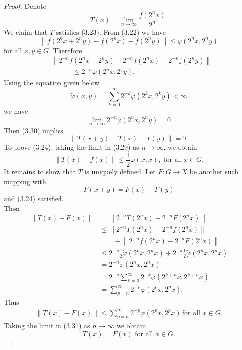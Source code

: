 \documentclass[a4paper,12pt]{report}
\begin{document}
\begin{thm}
\begin{proof}
Denote
$$
T(x)=\lim _{n \rightarrow \infty} \frac{f\left(2^n x\right)}{2^n}.
$$
We claim that $T$ satisfies (3.23).
From (3.22) we have
$$
\left\|f\left(2^n x+2^n y\right)-f\left(2^n x\right)-f\left(2^n y\right)\right\| \le \varphi\left(2^n x, 2^n y\right)
$$
for all $x, y \in G$. Therefore
\begin{eqnarray}
&\left\|2^{-n} f\left(2^n x+2^n y\right)-2^{-n} f\left(2^n x\right)-2^{-n} f\left(2^n y\right)\right\|\nonumber \\&\quad\quad\quad\le 2^{-n} \varphi\left(2^n x, 2^n y\right).
\end{eqnarray}
Using the equation given below
$$\tilde{\varphi}(x,y)=\sum_{k=0}^{\infty} 2^{-k} \varphi\left(2^kx,2^ky\right)<\infty $$
we have
$$
\lim _{n \rightarrow \infty} 2^{-n} \varphi\left(2^n x, 2^n y\right)=0
$$
Then (3.30) implies
$$
\|T(x+y)-T(x)-T(y)\|=0 .
$$
To prove (3.24), taking the limit in (3.29) as $n \rightarrow \infty$, we obtain
$$
\|T(x)-f(x)\| \le \frac{1}{2} \bar{\varphi}(x, x), \text { for all } x \in G .
$$
It remains to show that $T$ is uniquely defined. Let $F: G \rightarrow X$ be another such mapping with
$$
F(x+y)=F(x)+F(y)
$$
and (3.24) satisfied.\\
Then
$$
\begin{aligned}
	\|T(x)-F(x)\| & =\left\|2^{-n} T\left(2^n x\right)-2^{-n} F\left(2^n x\right)\right\| \\
	& \le\left\|2^{-n} T\left(2^n x\right)-2^{-n} f\left(2^n x\right)\right\|\\&\quad\quad+\left\|2^{-n} f\left(2^n x\right)-2^{-n} F\left(2^n x\right)\right\| \\
	& \le 2^{-n} \frac{1}{2} \tilde{\varphi}\left(2^n x, 2^n x\right)+2^{-n} \frac{1}{2} \tilde{\varphi}\left(2^n x, 2^n x\right) \\
	& =2^{-n} \tilde{\varphi}\left(2^n x, 2^n x\right) \\
	& =2^{-n} \sum_{k=0}^{\infty} 2^{-k} \varphi\left(2^{k+n} x, 2^{k+n} x\right) \\
	& =\sum_{p=n}^{\infty} 2^{-p} \varphi\left(2^p x, 2^p x\right) .
\end{aligned}
$$
Thus
\begin{eqnarray}
\|T(x)-F(x)\| \le \sum_{p=n}^{\infty} 2^{-p} \varphi\left(2^p x, 2^p x\right)\  \text {for all } x \in G.
\end{eqnarray}
Taking the limit in (3.31) as $n \rightarrow \infty$ we obtain$$
T(x)=F(x) \text { for all } x \in G.
$$
\end{proof}
\end{thm}
\end{document}
